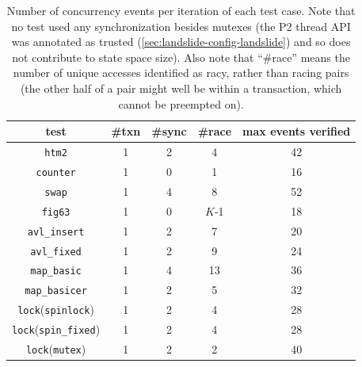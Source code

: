 \begin{table}[t]
	\begin{center}
		\small
		\begin{tabular}{c||c|c|c||c}
			{\bf test} & {\bf \#txn} & {\bf \#sync} & {\bf \#race} & {\bf max events verified} \\
			\hline
			{\tt htm2}		& 1	& 2	& 4	& 42	\\ %
			{\tt counter}		& 1	& 0	& 1	& 16	\\ %
			{\tt swap}		& 1	& 4	& 8	& 52	\\ %
			{\tt fig63}		& 1	& 0	& $K$-1	& 18	\\ %
			{\tt avl\_insert}	& 1	& 2	& 7	& 20	\\ %
			{\tt avl\_fixed}	& 1	& 2	& 9	& 24	\\ %
			{\tt map\_basic}	& 1	& 4	& 13	& 36	\\ %
			{\tt map\_basicer}	& 1	& 2	& 5	& 32	\\ %

			{\tt lock}({\tt spinlock})	& 1	& 2	& 4	& 28	\\ %
			{\tt lock}({\tt spin\_fixed})	& 1	& 2	& 4	& 28	\\ %
			{\tt lock}({\tt mutex})		& 1	& 2	& 2	& 40	\\ %
		\end{tabular}
	\end{center}
	\caption[Number of concurrency events per iteration of each test case.]
		{Number of concurrency events per iteration of each test case.
	Note that no test used any synchronization besides mutexes %
	(the P2 thread API was annotated as trusted (\cref{sec:landslide-config-landslide})
	and so does not contribute to state space size).
	Also note that ``\#race'' means the number of unique accesses identified as racy,
	rather than racing pairs
	(the other half of a pair might well be within a transaction, which cannot be preempted on).
	}
	\label{tab:tm-test-case-evence}
\end{table}

